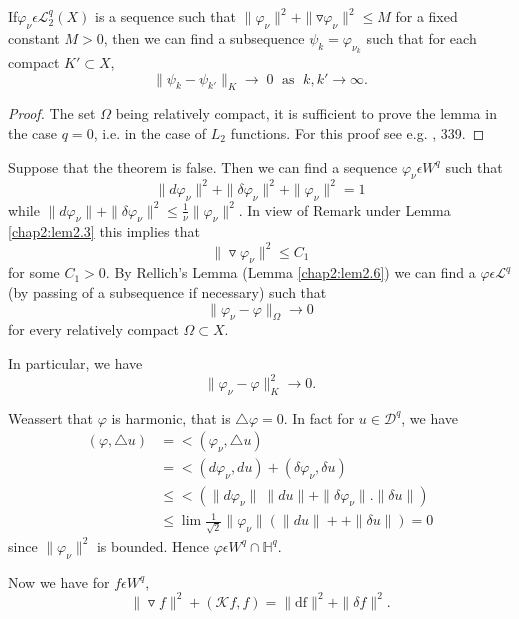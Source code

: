 If\pageoriginale $\varphi_\nu \epsilon \mathcal{L}^{q}_2 (X)$ is a
sequence such that $\parallel \varphi_\nu \parallel^2 + \parallel
\triangledown \varphi_\nu \parallel^2 \le M$ for a fixed constant
$M>0$, then we can find a subsequence $\psi_k=\varphi_{\nu_k}$ such
that for each compact $K'\subset X$, 
$$
\parallel \psi_k-\psi_{k'}\parallel_K \rightarrow \; 0
\; \text{ as }\; 
k,k'\rightarrow \infty.
$$

\begin{proof}
  The set $\Omega$ being relatively compact,
  it is sufficient to prove the lemma in the case $q=0$, i.e. in the
  case of $L_2$ functions. For this proof see e.g. \cite{key7}, 339.
\end{proof}

\medskip
{} 
Suppose that the theorem is false. Then we can find a sequence
$\varphi_\nu \epsilon W^q$ such that 
$$
\parallel d \varphi_\nu \parallel^2 +\parallel \delta \varphi _\nu
\parallel^2 + \|\varphi_\nu\|^2=1
$$
while $\|d\varphi_\nu\| + \|\delta
\varphi_\nu\|^2\le\frac{1}{\nu}\|\varphi_\nu\|^2$. In view of Remark
under Lemma \ref{chap2:lem2.3} this implies that   
$$
\|\triangledown \varphi_\nu \|^2 \le C_1
$$
for some $C_1 > 0$. By Rellich's Lemma (Lemma \ref{chap2:lem2.6}) we can find a
$\varphi \epsilon \mathcal{L}^q$ (by passing of a subsequence if
necessary) such that  
$$
\|\varphi_\nu - \varphi\|_\Omega\rightarrow 0  
$$
for every relatively compact $\Omega \subset X$.

In particular, we have
$$ 
\|\varphi_\nu-\varphi\|^2_K \rightarrow 0. 
$$

We\pageoriginale assert that $\varphi$ is harmonic, that is $\triangle
\varphi=0$. In fact for  $u \in \mathcal{D}^q$, we have 
\begin{align*}
  (\varphi,\triangle u)&=\lt (\varphi_\nu ,\triangle u)\\
  &=\lt (d \varphi_\nu,du)+(\delta \varphi_\nu ,\delta u)\\
  &\le \lt (\|d \varphi_\nu \| ~\|du\| + \| \delta \varphi_\nu \| . \|
  \delta u \|)\\ 
&\le \lim\frac{1}{\sqrt{2}}\|\varphi_\nu \| (\| du \| + 
  + \| \delta u \|) =0
\end{align*}
since $\| \varphi_\nu\|^2$ is bounded. Hence $\varphi \epsilon W^q
\cap \mathbb{H}^q$. 

Now we have for  $f \epsilon W^q$,
$$
\|\triangledown f \|^2 + (\mathcal{K}
f,f)=\|\text{df}\|^2 + \|\delta f \|^2.
$$

